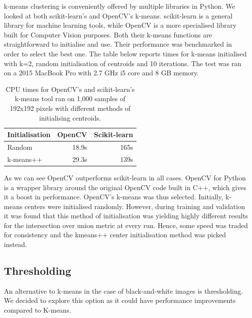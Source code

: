 k-means clustering is conveniently offered by multiple libraries in Python. We looked at both scikit-learn's and OpenCV's k-means. scikit-learn is a general library  for machine learning tools, while OpenCV is a more specialised library built for Computer Vision purposes. Both their k-means functions are straightforward to initialise and use. Their performance was benchmarked in order to select the best one. The table below reports times for k-means initialised with k=2, random initialisation of centroids and 10 iterations. The test was ran on a 2015 MacBook Pro with 2.7 GHz i5 core and 8 GB memory.

\begin{table}[]
\centering
\begin{tabular}{|l|l|l|}
\hline
\textbf{Initialisation} & \textbf{OpenCV} & \textbf{Scikit-learn} \\ \hline
Random                                   & \multicolumn{1}{r|}{18.9s}       & \multicolumn{1}{r|}{165s}              \\ \hline
k-means++                                & \multicolumn{1}{r|}{29.3s}       & \multicolumn{1}{r|}{139s}              \\ \hline
\end{tabular}

\caption{CPU times for OpenCV's and scikit-learn's k-means tool ran on 1,000 samples of 192x192 pixels with different methods of initialising centroids.}
\end{table}

As we can see OpenCV outperforms scikit-learn in all cases. OpenCV for Python is a wrapper library around the original OpenCV code built in C++, which gives it a boost in performance. OpenCV's k-means was thus selected. Initially, k-means centers were initialised randomly. However, during training and validation it was found that this method of initialisation was yielding highly different results for the intersection over union metric at every run. Hence, some speed was traded for consistency and the kmeans++ center initialisation method was picked instead.

\subsection{Thresholding}

An alternative to k-means in the case of black-and-white images is thresholding. We decided to explore this option as it could have performance improvements compared to K-means.

